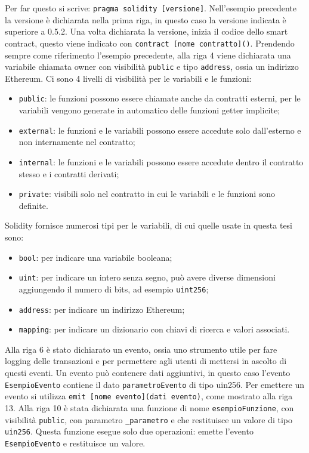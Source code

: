 \documentclass[a4paper]{article}
\begin{document}
      Per far questo si scrive: \newline \verb|pragma solidity [versione]|. Nell'esempio precedente la versione è dichiarata nella prima riga, in questo caso la versione indicata è superiore a 0.5.2.
      \newline
      Una volta dichiarata la versione, inizia il codice dello smart contract, questo viene indicato con \verb|contract [nome contratto]()|. Prendendo sempre come riferimento l'esempio precedente,
      alla riga 4 viene dichiarata una variabile chiamata owner con visibilità \verb|public| e tipo \verb|address|, ossia un indirizzo Ethereum. Ci sono 4 livelli di visibilità per le variabili e le funzioni:
      \begin{itemize}
        \item \verb|public|: le funzioni possono essere chiamate anche da contratti esterni, per le variabili vengono generate in automatico delle funzioni getter implicite;
        \item \verb|external|: le funzioni e le variabili possono essere accedute solo dall'esterno e non internamente nel contratto;
        \item \verb|internal|: le funzioni e le variabili possono essere accedute dentro il contratto stesso e i contratti derivati;
        \item \verb|private|: visibili solo nel contratto in cui le variabili e le funzioni sono definite\cite{solidityvisibility}.
      \end{itemize}
      Solidity fornisce numerosi tipi per le variabili, di cui quelle usate in questa tesi sono:
      \begin{itemize}
        \item \verb|bool|: per indicare una variabile booleana;
        \item \verb|uint|: per indicare un intero senza segno, può avere diverse dimensioni aggiungendo il numero di bits, ad esempio \verb|uint256|;
        \item \verb|address|: per indicare un indirizzo Ethereum;
        \item \verb|mapping|: per indicare un dizionario con chiavi di ricerca e valori associati\cite{soliditytypes}.
      \end{itemize}
      Alla riga 6 è stato dichiarato un evento, ossia uno strumento utile per fare logging delle transazioni e per permettere agli utenti di mettersi in ascolto di questi eventi.
      Un evento può contenere dati aggiuntivi, in questo caso l'evento \verb|EsempioEvento| contiene il dato \verb|parametroEvento| di tipo uin256.
      Per emettere un evento si utilizza \verb|emit [nome evento](dati evento)|, come mostrato alla riga 13.
      \newline
      Alla riga 10 è stata dichiarata una funzione di nome \verb|esempioFunzione|, con visibilità \verb|public|, con parametro \verb|_parametro| e che restituisce un valore di tipo \verb|uin256|.
      Questa funzione esegue solo due operazioni: emette l'evento \verb|EsempioEvento| e restituisce un valore. 
\end{document}
